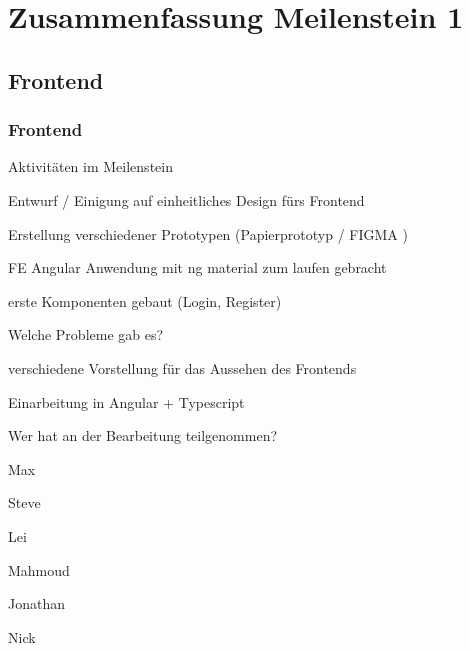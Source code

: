 \documentclass{beamer}
\begin{document}
\section{Zusammenfassung Meilenstein 1}
\subsection{Frontend}
\begin{frame}

    \frametitle{Frontend}
    \begin{description}[font=$\bullet$]
        \item Aktivitäten im Meilenstein
              \begin{description}[font=$\bullet$]
                  \item Entwurf / Einigung auf einheitliches Design fürs Frontend
                  \item Erstellung verschiedener Prototypen (Papierprototyp / FIGMA )
                  \item FE Angular Anwendung mit ng material zum laufen gebracht
                  \item erste Komponenten gebaut (Login, Register)
              \end{description}
    \end{description}
\end{frame}
\begin{frame}
    \begin{description}[font=$\bullet$]
        \item Welche Probleme gab es?
              \begin{description}[font=$\bullet$]
                  \item verschiedene Vorstellung für das Aussehen des Frontends
                  \item Einarbeitung in Angular + Typescript
              \end{description}


        \item Wer hat an der Bearbeitung teilgenommen?
              \begin{description}[font=$\bullet$]
                  \item Max \item Steve\item Lei\item Mahmoud\item Jonathan\item Nick
              \end{description}

    \end{description}
\end{frame}
\end{document}
